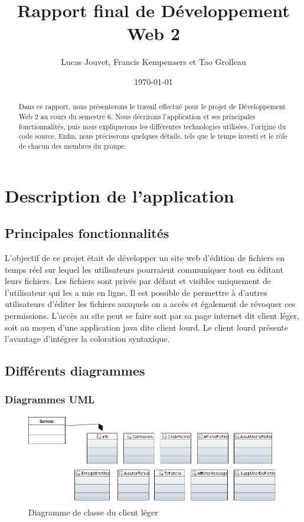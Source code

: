 \documentclass[a4paper, 12pt]{article}
\title{Rapport final de Développement Web 2}
\author{Lucas Jouvet, Francis Kempenaers et Tao Grolleau}
\date{\today}
\begin{document}
\maketitle

\begin{abstract}
  Dans ce rapport, nous présenterons le travail effectué pour le projet de Développement Web 2 au cours du semestre 6. Nous décrirons l'application et ses principales fonctionnalités, puis nous expliquerons les différentes technologies utilisées, l'origine du code source. Enfin, nous préciserons quelques détails, tels que le temps investi et le rôle de chacun des membres du groupe.
\end{abstract}

\newpage

\section{Description de l'application}

\subsection{Principales fonctionnalités}

L'objectif de ce projet était de développer un site web d'édition de fichiers en temps réel sur lequel les utilisateurs pourraient communiquer tout en éditant leurs fichiers. Les fichiers sont privés par défaut et visibles uniquement de l'utilisateur qui les a mis en ligne. Il est possible de permettre à d'autres utilisateurs d'éditer les fichiers auxquels on a accès et également de révoquer ces permissions. L'accès au site peut se faire soit par sa page internet dit client léger, soit au moyen d'une application java dite client lourd. Le client lourd présente l'avantage d'intégrer la coloration syntaxique.

\subsection{Différents diagrammes}

\subsubsection{Diagrammes UML}

\begin{figure}[H]
  \begin{center}
    \includegraphics[scale=0.5]{DiagrammeClientLeger.PNG}
  \end{center}
  \caption{Diagramme de classe du client léger}
\end{figure}
\end{document}
